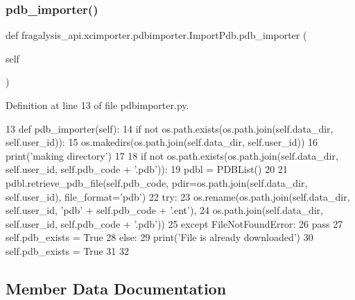 \subsubsection{\texorpdfstring{pdb\+\_\+importer()}{pdb\_importer()}}
{\footnotesize\ttfamily def fragalysis\+\_\+api.\+xcimporter.\+pdbimporter.\+Import\+Pdb.\+pdb\+\_\+importer (\begin{DoxyParamCaption}\item[{}]{self }\end{DoxyParamCaption})}



Definition at line 13 of file pdbimporter.\+py.


\begin{DoxyCode}
13     \textcolor{keyword}{def }pdb\_importer(self):
14         \textcolor{keywordflow}{if} \textcolor{keywordflow}{not} os.path.exists(os.path.join(self.data\_dir, self.user\_id)):
15             os.makedirs(os.path.join(self.data\_dir, self.user\_id))
16             print(\textcolor{stringliteral}{'making directory'})
17 
18         \textcolor{keywordflow}{if} \textcolor{keywordflow}{not} os.path.exists(os.path.join(self.data\_dir, self.user\_id, self.pdb\_code + \textcolor{stringliteral}{'.pdb'})):
19             pdbl = PDBList()
20             
21             pdbl.retrieve\_pdb\_file(self.pdb\_code, pdir=os.path.join(self.data\_dir, self.user\_id), 
      file\_format=\textcolor{stringliteral}{'pdb'})
22             \textcolor{keywordflow}{try}:
23                 os.rename(os.path.join(self.data\_dir, self.user\_id, \textcolor{stringliteral}{'pdb'} + self.pdb\_code + \textcolor{stringliteral}{'.ent'}),
24                       os.path.join(self.data\_dir, self.user\_id, self.pdb\_code + \textcolor{stringliteral}{'.pdb'}))
25             \textcolor{keywordflow}{except} FileNotFoundError:
26                 \textcolor{keywordflow}{pass}
27             self.pdb\_exists = \textcolor{keyword}{True}
28         \textcolor{keywordflow}{else}:
29             print(\textcolor{stringliteral}{'File is already downloaded'})
30             self.pdb\_exists = \textcolor{keyword}{True}
31 
32 
\end{DoxyCode}


\subsection{Member Data Documentation}
\mbox{\label{classfragalysis__api_1_1xcimporter_1_1pdbimporter_1_1_import_pdb_a682ae0196455b3ba21d1f6f8083324ea}} 

